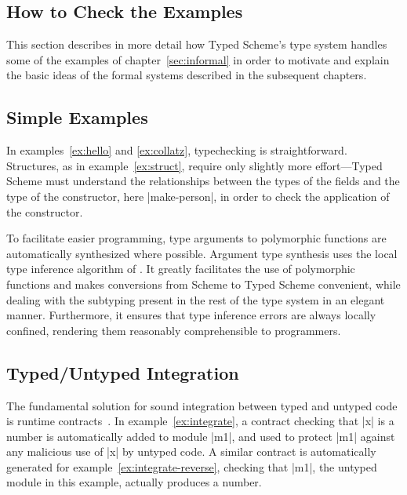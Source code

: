 \begin{schemeregion}
\section{How to Check the Examples}
\label{sec:semiformal}

This section describes in more detail how Typed Scheme's type system handles some of
the examples of chapter~\ref{sec:informal} in order to motivate and
explain the basic ideas of the formal systems described in the
subsequent chapters.

\subsection{Simple Examples}

In examples~\ref{ex:hello} and \ref{ex:collatz}, typechecking is
straightforward.  Structures, as in example~\ref{ex:struct}, require
only slightly more effort---Typed Scheme must understand the
relationships between the types of the fields and the type of the
constructor, here \scheme|make-person|, in order to check the
application of the constructor.  

To facilitate easier programming, type arguments to polymorphic
functions are automatically synthesized where possible. Argument type
synthesis uses the local type inference algorithm of
\citet{pierce:lti}.  It greatly facilitates the use of polymorphic
functions and makes conversions from Scheme to Typed Scheme
convenient, while dealing with the subtyping present in the rest of
the type system in an elegant manner. Furthermore, it ensures that
type inference errors are always locally confined, rendering them
reasonably comprehensible to programmers.

\subsection{Typed/Untyped Integration}

The fundamental solution for sound integration between typed and
untyped code is runtime contracts~\cite{ff:ho-contracts}.  In
example~\ref{ex:integrate}, a contract checking that \scheme|x| is a
number is automatically added to module \scheme|m1|, and used to
protect \scheme|m1| against any malicious use of \scheme|x| by untyped
code.  A similar contract is automatically generated for
example~\ref{ex:integrate-reverse}, checking that \scheme|m1|, the
untyped module in this example, actually produces a number.


\end{schemeregion}
